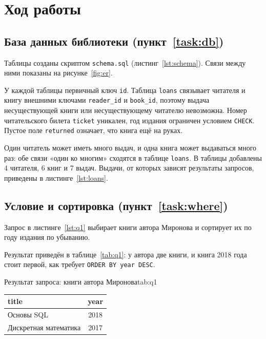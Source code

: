 \section{Ход работы}

\subsection{База данных библиотеки (пункт~\ref{task:db})}
Таблицы созданы скриптом \texttt{schema.sql} (листинг~\ref{lst:schema}). Связи между ними
показаны на рисунке~\ref{fig:er}.


У каждой таблицы первичный ключ \texttt{id}. Таблица \texttt{loans} связывает читателя и
книгу внешними ключами \texttt{reader\_id} и \texttt{book\_id}, поэтому выдача
несуществующей книги или несуществующему читателю невозможна. Номер читательского билета
\texttt{ticket} уникален, год издания ограничен условием \texttt{CHECK}. Пустое поле
\texttt{returned} означает, что книга ещё на руках.


Один читатель может иметь много выдач, и одна книга может выдаваться много раз: обе связи
«один ко многим» сходятся в таблице \texttt{loans}. В таблицы добавлены 4 читателя, 6 книг и
7 выдач. Выдачи, от которых зависят результаты запросов, приведены в
листинге~\ref{lst:loans}.


\subsection{Условие и сортировка (пункт~\ref{task:where})}
Запрос в листинге~\ref{lst:q1} выбирает книги автора Миронова и сортирует их по году
издания по убыванию.


Результат приведён в таблице~\ref{tab:q1}: у автора две книги, и книга 2018 года стоит
первой, как требует \texttt{ORDER BY year DESC}.

\begin{bbttable}{Результат запроса: книги автора Миронова}{tab:q1}
  \begin{tabular}{|l|c|}
    \hline
    title & year \\ \hline
    Основы SQL & 2018 \\ \hline
    Дискретная математика & 2017 \\ \hline
  \end{tabular}
\end{bbttable}

